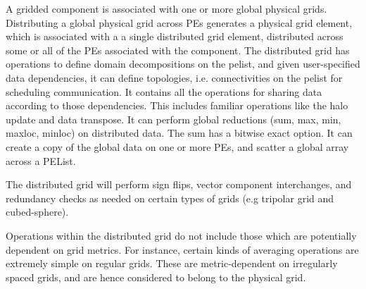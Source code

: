 A gridded component is associated with one or more global physical
grids.  Distributing a global physical grid across PEs generates a
physical grid element, which is associated with a a single
distributed grid element, distributed across some or all of the PEs
associated with the component. The distributed grid has operations to
define domain decompositions on the pelist, and given user-specified
data dependencies, it can define topologies, i.e. connectivities on
the pelist for scheduling communication. It contains all the
operations for sharing data according to those dependencies.  This
includes familiar operations like the halo update and data transpose.
It can perform global reductions (sum, max, min, maxloc, minloc) on
distributed data.  The sum has a bitwise exact option. It can create a
copy of the global data on one or more PEs, and scatter a global array
across a PEList.

The distributed grid will perform sign flips, vector component interchanges,
and redundancy checks as needed on certain types of grids (e.g
tripolar grid and cubed-sphere).

Operations within the distributed grid do not include those which are
potentially dependent on grid metrics. For instance, certain kinds of
averaging operations are extremely simple on regular grids. These are
metric-dependent on irregularly spaced grids, and are hence considered
to belong to the physical grid.

